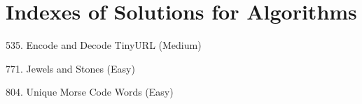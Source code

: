 \section*{Indexes of Solutions for Algorithms}
\label{sec:algo_ind}

\begin{flushleft}
535. Encode and Decode TinyURL (Medium)\hfill\pageref{algo:535}

771. Jewels and Stones (Easy)\hfill\pageref{algo:771}

804. Unique Morse Code Words (Easy)\hfill\pageref{algo:804}
\end{flushleft}

\newpage
